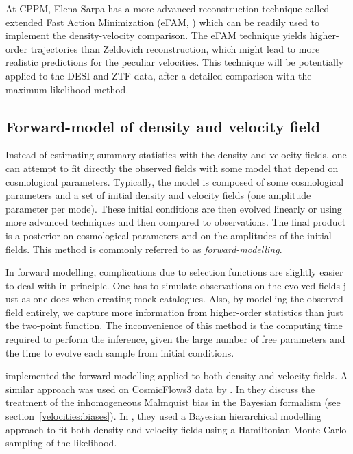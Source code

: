     At CPPM, Elena Sarpa has a more advanced reconstruction technique 
    called extended Fast Action Minimization (eFAM, \cite{sarpaExtendedFastAction2021})
    which can be readily used to implement the density-velocity comparison.
    The eFAM technique yields higher-order trajectories than 
    Zeldovich reconstruction, which might lead to more realistic 
    predictions for the peculiar velocities. 
    This technique will be potentially applied to the DESI and ZTF data,
    after a detailed comparison with the maximum likelihood method. 


    \subsection{Forward-model of density and velocity field}
    \label{velocities:methods:forward}

    Instead of estimating summary statistics with the density and velocity fields, 
    one can attempt to fit directly the observed fields with some model 
    that depend on cosmological parameters. Typically, the model is composed 
    of some cosmological parameters and a set of initial density and velocity fields
    (one amplitude parameter per mode). These initial conditions are then evolved 
    linearly or using more advanced techniques and then compared to observations. 
    The final product is a posterior on cosmological parameters and on the amplitudes 
    of the initial fields. This method is commonly referred to as \emph{forward-modelling}. 

    In forward modelling, complications due to selection functions are slightly easier 
    to deal with in principle. One has to simulate observations on the evolved fields j
    ust as one does when creating mock catalogues. 
    Also, by modelling the observed field entirely, we capture 
    more information from higher-order statistics than just the two-point function. 
    The inconvenience of this method is the computing time required to perform the inference,
    given the large number of free parameters and the time to evolve each sample from initial conditions. 
    
    \cite{lavauxBayesian3DVelocity2016} implemented the forward-modelling applied to 
    both density and velocity fields. A similar approach was used on CosmicFlows3 data 
    by \cite{grazianiPeculiarVelocityField2019}. In \cite{boruahReconstructingDarkMatter2021}
    they discuss the treatment of the inhomogeneous Malmquist bias in the Bayesian formalism 
    (see section~\ref{velocities:biases}).
    In \cite{prideaux-gheeFieldBasedPhysicalInference2022}, they used a Bayesian hierarchical modelling 
    approach to fit both density and velocity fields using a Hamiltonian Monte Carlo sampling of the 
    likelihood. 

